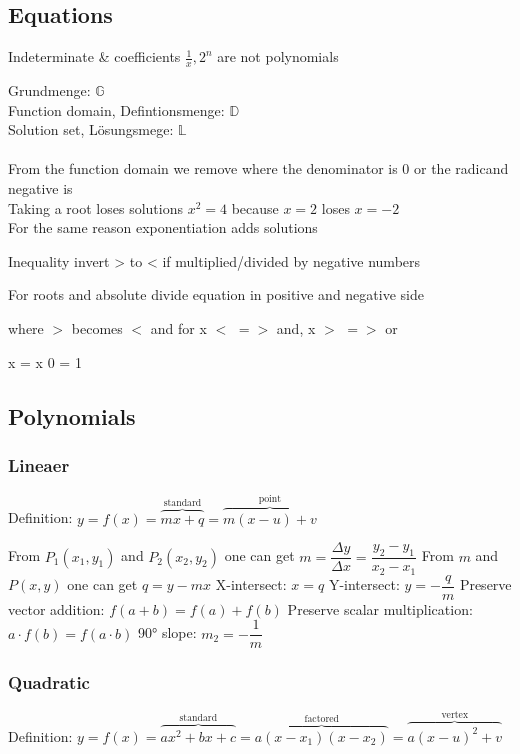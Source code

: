 \subsection{Equations}

Indeterminate \& coefficients
$\frac{1}{x}, 2^n$ are not polynomials

Grundmenge: $\mathbb{G}$ \\
Function domain, Defintionsmenge: $\mathbb{D}$ \\
Solution set, Lösungsmege: $\mathbb{L}$ \\
\\
From the function domain we remove where the denominator is 0 or the radicand negative is
\\
Taking a root loses solutions $x^2 = 4$ because $x = 2$ loses $x = -2$ \\
For the same reason exponentiation adds solutions

Inequality invert > to < if multiplied/divided by negative numbers

For roots and absolute divide equation in positive and negative side

where $>$ becomes $<$ and for x $<$ $=>$ and, x $>$ $=>$ or

x = x 
0 = 1

\subsection{Polynomials}

\subsubsection{Lineaer}

Definition: $y = f(x) = 
\overbrace{mx+q}^\text{standard} =
\overbrace{m(x-u) + v}^\text{point}$

From $P_1(x_1,y_1)$ and $P_2(x_2, y_2)$ one can get $m = \dfrac{\Delta y}{\Delta x} = \dfrac{y_2-y_1}{x_2-x_1}$
From $m$ and $P(x, y)$ one can get $q = y-mx$
X-intersect: $x = q$
Y-intersect: $y = -\dfrac{q}{m}$
Preserve vector addition: $f(a + b) = f(a) + f(b)$
Preserve scalar multiplication: $a\cdot f(b) = f(a\cdot b)$
90° slope: $m_2 = -\dfrac{1}{m}$

\subsubsection{Quadratic}

Definition: $y = f(x) = 
\overbrace{ax^2+bx+c}^\text{standard}=
\overbrace{a(x-x_1)(x-x_2)}^\text{factored}=
\overbrace{a(x-u)^2+v}^\text{vertex}$

